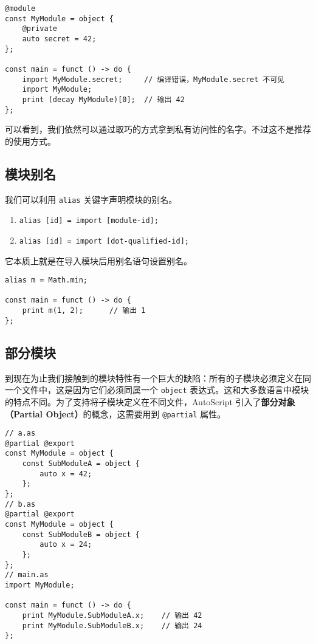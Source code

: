 \begin{minipage}[c]{0.95\textwidth}
\vspace{1.0em}
\begin{lstlisting}
@module
const MyModule = object {
    @private
    auto secret = 42;
};

const main = funct () -> do {
    import MyModule.secret;		// 编译错误，MyModule.secret 不可见
    import MyModule;
    print (decay MyModule)[0];	// 输出 42
};
\end{lstlisting}
\end{minipage}

可以看到，我们依然可以通过取巧的方式拿到私有访问性的名字。不过这不是推荐的使用方式。

\subsection{模块别名}

我们可以利用 \lstinline!alias! 关键字声明模块的别名。

\begin{grammar}[模块别名] \label{grm:module-alias}
\begin{enumerate}
	\item \lstinline!alias [id] = import [module-id];!
	\item \lstinline!alias [id] = import [dot-qualified-id];!
\end{enumerate}
\end{grammar}

它本质上就是在导入模块后用别名语句设置别名。

\begin{lstlisting}
alias m = Math.min;

const main = funct () -> do {
	print m(1, 2);		// 输出 1
};
\end{lstlisting}

\subsection{部分模块}

到现在为止我们接触到的模块特性有一个巨大的缺陷：所有的子模块必须定义在同一个文件中，这是因为它们必须同属一个 \lstinline!object! 表达式。这和大多数语言中模块的特点不同。为了支持将子模块定义在不同文件，AutoScript 引入了\textbf{部分对象（Partial Object）}的概念，这需要用到 \lstinline!@partial! 属性。

\begin{lstlisting}
// a.as
@partial @export
const MyModule = object {
	const SubModuleA = object {
		auto x = 42;
	};
};
// b.as
@partial @export
const MyModule = object {
	const SubModuleB = object {
		auto x = 24;
	};
};
// main.as
import MyModule;

const main = funct () -> do {
	print MyModule.SubModuleA.x;	// 输出 42
	print MyModule.SubModuleB.x;	// 输出 24
};
\end{lstlisting}

